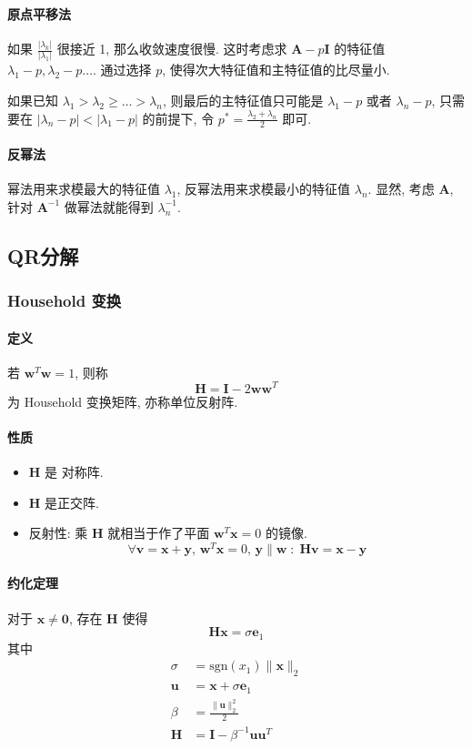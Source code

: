 \documentclass{ctexart}
\newcommand{\sgn}{\mathrm{sgn}}
\begin{document}
\paragraph{原点平移法}
    如果 $\frac{|\lambda_k|}{|\lambda_1|}$ 很接近 1, 那么收敛速度很慢.
    这时考虑求 $\mathbf{A} - p \mathbf{I} $ 的特征值 $\lambda_1 - p, \lambda_2 - p \ldots$.
    通过选择 $p$, 使得次大特征值和主特征值的比尽量小.\par
    如果已知 $\lambda_1 > \lambda_2 \ge \ldots > \lambda_n$,
    则最后的主特征值只可能是 $\lambda_1 -p$ 或者 $\lambda_n - p$, 只需要在
    $|\lambda_n - p| < |\lambda_1 - p|$ 的前提下, 令 $p^* = \frac{\lambda_2 + \lambda_n}{2}$ 即可.
\paragraph{反幂法}
    幂法用来求模最大的特征值 $\lambda_1$, 反幂法用来求模最小的特征值 $\lambda_n$.
    显然, 考虑 $\mathbf{A}$, 针对 $ \mathbf{A}^{-1}$ 做幂法就能得到 $\lambda_n^{-1}$.\par

\subsection{QR分解}
\subsubsection{Household 变换}
\paragraph{定义}
    若 $ \mathbf{w}^T \mathbf{w} = 1$, 则称 \[
        \mathbf{H} = \mathbf{I} - 2 \mathbf{w} \mathbf{w}^T\]
    为 Household 变换矩阵, 亦称单位反射阵.
\paragraph{性质}
    \begin{itemize}
        \item $\mathbf{H} $ 是 对称阵.
        \item $\mathbf{H} $ 是正交阵.
        \item 反射性: 乘 $\mathbf{H}$ 就相当于作了平面 $\mathbf{w}^T \mathbf{x} = 0$ 的镜像.\[
            \forall \mathbf{v} = \mathbf{x} + \mathbf{y},\,\mathbf{w}^T \mathbf{x} = 0,\, \mathbf{y} \parallel \mathbf{w}\;:\;
            \mathbf{H} \mathbf{v} = \mathbf{x} - \mathbf{y} \]
    \end{itemize}
\paragraph{约化定理}
    对于 $\mathbf{x} \neq \mathbf{0} $, 存在 $ \mathbf{H}$ 使得 \[
        \mathbf{H} \mathbf{x} = \sigma \mathbf{e}_1\]
    其中 \begin{align*}
        \sigma &= \sgn (x_1) \|\mathbf{x} \|_2\\
        \mathbf{u}& = \mathbf{x} + \sigma \mathbf{e}_1\\
        \beta &= \frac{\|\mathbf{u}\|_2^2}{2}\\
        \mathbf{H} &= \mathbf{I} - \beta^{-1} \mathbf{u} \mathbf{u}^T
    \end{align*}
\end{document}
